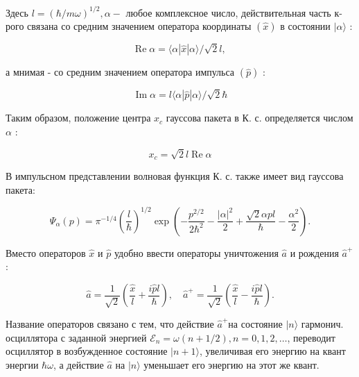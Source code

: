 \documentclass[10pt]{article}
\begin{document}
Здесь $l=(\hbar / m \omega)^{1 / 2}, \alpha-$ любое комплексное число, действительная часть к-рого связана со средним значением оператора координаты $(\hat{x})$ в состоянии $|\alpha\rangle$ :



\[

\operatorname{Re} \alpha=\langle\alpha|\hat{x}| \alpha\rangle / \sqrt{2} l \text {, }

\]



а мнимая - со средним значением оператора импульса $(\hat{p})$ :



\[

\operatorname{Im} \alpha=l\langle\alpha|\hat{p}| \alpha\rangle / \sqrt{2} \hbar

\]



Таким образом, положение центра $x_{c}$ гауссова пакета в К. с. определяется числом $\alpha$ :



\[

x_{c}=\sqrt{2} l \operatorname{Re} \alpha

\]



В импульсном представлении волновая функция К. с. также имеет вид гауссова пакета:



\[

\Psi_{\alpha}(p)=\pi^{-1 / 4}\left(\frac{l}{\hbar}\right)^{1 / 2} \exp \left(-\frac{p^{2 / 2}}{2 \hbar^{2}}-\frac{|\alpha|^{2}}{2}+\frac{\sqrt{2} \alpha p l}{\hbar}-\frac{\alpha^{2}}{2}\right) .

\]



Вместо операторов $\hat{x}$ и $\hat{p}$ удобно ввести операторы уничтожения $\hat{a}$ и рождения $\hat{a}^{+}$:



\[

\hat{a}=\frac{1}{\sqrt{2}}\left(\frac{\hat{x}}{l}+\frac{i \hat{p} l}{\hbar}\right), \quad \hat{a}^{+}=\frac{1}{\sqrt{2}}\left(\frac{\hat{x}}{l}-\frac{i \hat{p} l}{\hbar}\right) .

\]



Название операторов связано с тем, что действие $\hat{a}^{+}$на состояние $|n\rangle$ гармонич. осциллятора с заданной энергией $\mathscr{E}_{n}=\omega(n+1 / 2), n=0,1,2, \ldots$, переводит осциллятор в возбужденное состояние $|n+1\rangle$, увеличивая его энергию на квант энергии $\hbar \omega$, а действие $\hat{a}$ на $|n\rangle$ уменьшает его энергию на этот же квант.
\end{document}
